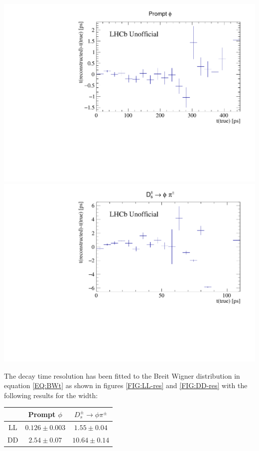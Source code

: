 \begin{center}
\includegraphics[width=.49\textwidth]{figs/time_res_incl/all-prof.pdf}
\includegraphics[width=.49\textwidth]{figs/time_res_Ds/LL-prof.pdf}
\label{FIG:all-prof}
\end{center}
The decay time resolution has been fitted to the Breit Wigner distribution in equation \eqref{EQ:BWt} as shown in figures \ref{FIG:LL-res} and \ref{FIG:DD-res} with the following results for the width:

\begin{center}
\begin{tabular}{c|cc}
& Prompt $\phi$ & $D_s^\pm\rightarrow \phi \pi^\pm$ \\ 
\hline 
LL& $0.126 \pm 0.003$ & $1.55 \pm 0.04$ \\ 
DD& $2.54 \pm 0.07$ & $10.64 \pm 0.14$ \\ 
\end{tabular} 
\end{center}

